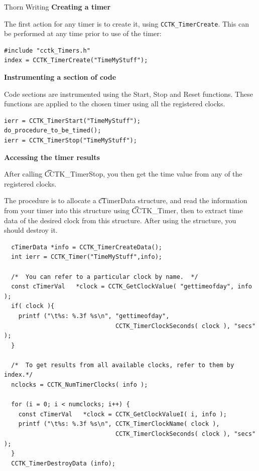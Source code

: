 \begin{cactuspart}{Thorn Writing}
{\bf Creating a timer}

The first action for any timer is to create it, using
\texttt{CCTK\_TimerCreate}. 
This can be performed at any time prior to use of the timer:

\begin{verbatim}
#include "cctk_Timers.h"
index = CCTK_TimerCreate("TimeMyStuff");
\end{verbatim}

{\bf Instrumenting a section of code}

Code sections are instrumented using the Start, Stop and Reset functions. These
functions are applied to the chosen timer using all the registered clocks.
\begin{verbatim}
ierr = CCTK_TimerStart("TimeMyStuff");
do_procedure_to_be_timed();
ierr = CCTK_TimerStop("TimeMyStuff");
\end{verbatim}

{\bf Accessing the timer results}

After calling {\t CCTK\_TimerStop}, you then get the time value from
any of the registered clocks.

The procedure is to allocate a {\t cTimerData} structure,
and read the information from your timer into this structure
using {\t CCTK\_Timer}, then to extract time data of the desired clock from
this structure.  After using the structure, you should destroy it.

\begin{verbatim}
  cTimerData *info = CCTK_TimerCreateData();
  int ierr = CCTK_Timer("TimeMyStuff",info);

  /*  You can refer to a particular clock by name.  */
  const cTimerVal   *clock = CCTK_GetClockValue( "gettimeofday", info );
  if( clock ){
    printf ("\t%s: %.3f %s\n", "gettimeofday",
                               CCTK_TimerClockSeconds( clock ), "secs" );
  }

  /*  To get results from all available clocks, refer to them by index.*/
  nclocks = CCTK_NumTimerClocks( info );

  for (i = 0; i < numclocks; i++) {
    const cTimerVal   *clock = CCTK_GetClockValueI( i, info );
    printf ("\t%s: %.3f %s\n", CCTK_TimerClockName( clock ),
                               CCTK_TimerClockSeconds( clock ), "secs" );
  }
  CCTK_TimerDestroyData (info);
\end{verbatim}



\end{cactuspart}
